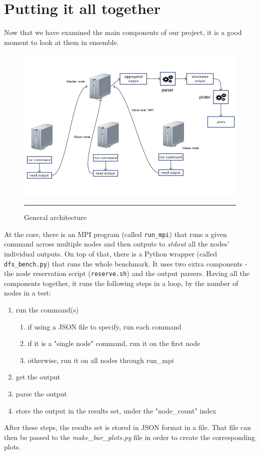 

\section{Putting it all together}

Now that we have examined the main components of our project, it is a good moment to look at them in ensemble.

\begin{figure}[H]
  \centering
    \includegraphics[scale=0.5]{Figures/architecture.png}
    \rule{25em}{0.5pt}
  \caption[General architecture]{General architecture}
  \label{fig:architecture}
\end{figure}

At the core, there is an MPI program (called \texttt{run\_mpi}) that runs a given command across multiple nodes and then outputs to \textit{stdout} all the nodes' individual outputs. On top of that, there is a Python wrapper (called \texttt{dfs\_bench.py}) that runs the whole benchmark. It uses two extra components - the node reservation script (\texttt{reserve.sh}) and the output parsers. Having all the components together, it runs the following steps in a loop, by the number of nodes in a test:

\begin{enumerate}

\item run the command(s)
\begin{enumerate}
\item if using a JSON file to specify, run each command
\item if it is a "single node" command, run it on the first node
\item otherwise, run it on all nodes through run\_mpi
\end{enumerate}

\item get the output
\item parse the output
\item store the output in the results set, under the "node\_count" index

\end{enumerate}

After these steps, the results set is stored in JSON format in a file. That file can then be passed to the \textit{make\_bar\_plots.py} file in order to create the corresponding plots.

